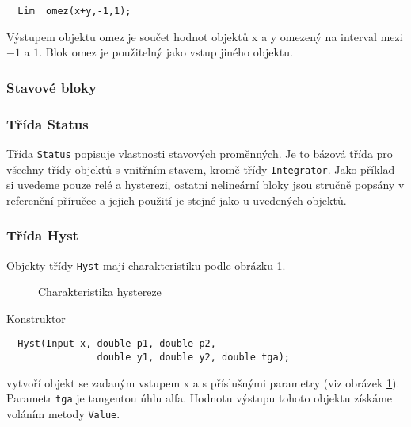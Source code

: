 \documentclass[a4paper]{article}
\begin{document}
\begin{verbatim}
  Lim  omez(x+y,-1,1);
\end{verbatim}

Výstupem objektu omez je součet hodnot objektů x a y omezený na
interval mezi $-1$ a $1$. Blok omez je použitelný jako vstup jiného
objektu.


\subsubsection{Stavové bloky}

\subsubsection*{Třída Status}

Třída \verb|Status| popisuje vlastnosti stavových proměnných. Je to
bázová třída pro všechny třídy objektů s vnitřním stavem, kromě
třídy \verb|Integrator|. Jako příklad si uvedeme pouze relé
a hysterezi, ostatní nelineární bloky jsou stručně popsány
v referenční příručce a jejich použití je stejné jako
u uvedených objektů.

\subsubsection*{Třída  Hyst}

Objekty třídy  \verb|Hyst|  mají charakteristiku podle obrázku \ref{o6}.

\begin{figure}[ht]
  \begin{center}
    \caption{Charakteristika hystereze}
    \label{o6}
  \end{center}
\end{figure}


Konstruktor

\begin{verbatim}
  Hyst(Input x, double p1, double p2,
                double y1, double y2, double tga);
\end{verbatim}

vytvoří objekt se zadaným vstupem x a s příslušnými parametry
(viz obrázek \ref{o6}). Parametr \verb|tga| je tangentou úhlu alfa. Hodnotu
výstupu tohoto objektu získáme voláním metody \verb|Value|.
\end{document}
